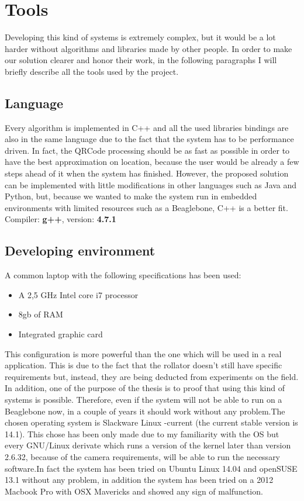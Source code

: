 \chapter{Tools}
Developing this kind of systems is extremely complex, but it would be a lot harder without algorithms and libraries made by other people.
In order to make our solution clearer and honor their work, in the following paragraphs I will briefly describe all the tools used by the project.

\section{Language}
Every algorithm is implemented in C++ and all the used libraries bindings are also in the same language due to the fact that the system has to be performance driven. In fact, the QRCode processing should be as fast as possible in order to have the best approximation on location, because the user would be already a few steps ahead of it when the system has finished. However, the proposed solution can be implemented with little modifications in other languages such as Java and Python, but, because we wanted to make the system run in embedded environments with limited resources such as a Beaglebone, C++ is a better fit.
\newline Compiler: \textbf{g++},  version: \textbf{4.7.1}


\section{Developing environment}
A common laptop with the following specifications has been used:
\begin{itemize}
  \item A 2,5 GHz Intel core i7 processor
  \item 8gb of RAM
  \item Integrated graphic card
\end{itemize}
This configuration is more powerful than the one which will be used in a real application. This is due to the fact that the rollator doesn't still have specific requirements but, instead, they are being deducted from experiments on the field. In addition, one of the purpose of the thesis is to proof that using this kind of systems is possible. Therefore, even if the system will not be able to run on a Beaglebone now, in a couple of years it should work without any problem.The chosen operating system is Slackware Linux -current (the current stable version is 14.1). This chose has been only made due to my familiarity with the OS but every GNU/Linux derivate which runs a version of the kernel later than version 2.6.32, because of the camera requirements, will be able to run the necessary software.In fact the system has been tried on Ubuntu Linux 14.04 and openSUSE 13.1 without any problem, in addition the system has been tried on a 2012 Macbook Pro with OSX Mavericks and showed any sign of malfunction. 

